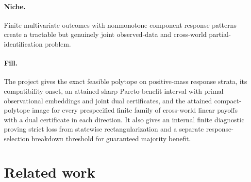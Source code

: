 \documentclass{article}
\begin{document}
\paragraph{Niche.} Finite multivariate outcomes with nonmonotone component response patterns create a tractable but genuinely joint observed-data and cross-world partial-identification problem.

\paragraph{Fill.} The project gives the exact feasible polytope on positive-mass response strata, its compatibility onset, an attained sharp Pareto-benefit interval with primal observational embeddings and joint dual certificates, and the attained compact-polytope image for every prespecified finite family of cross-world linear payoffs with a dual certificate in each direction. It also gives an internal finite diagnostic proving strict loss from statewise rectangularization and a separate response-selection breakdown threshold for guaranteed majority benefit.

\section{Related work}
\end{document}
